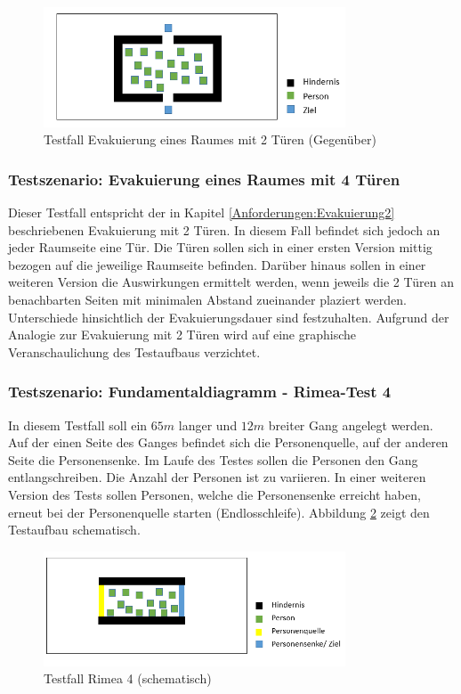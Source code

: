 \begin{figure}[htpb]
	\centering
	\includegraphics[width=0.8\textwidth]{abbildungen/Test_Evakuierung2_Gegueb.png}
	\caption{Testfall Evakuierung eines Raumes mit 2 Türen (Gegenüber)}
	\label{fig:Test_Evakuierung2_Gegueb}
\end{figure}

\subsubsection{Testszenario: Evakuierung eines Raumes mit 4 Türen}
Dieser Testfall entspricht der in Kapitel \ref{Anforderungen:Evakuierung2} beschriebenen Evakuierung mit 2 Türen. In diesem Fall befindet sich jedoch an jeder Raumseite eine Tür. Die Türen sollen sich in einer ersten Version mittig bezogen auf die jeweilige Raumseite befinden. Darüber hinaus sollen in einer weiteren Version die Auswirkungen ermittelt werden, wenn jeweils die 2 Türen an benachbarten Seiten mit minimalen Abstand zueinander plaziert werden. Unterschiede hinsichtlich der Evakuierungsdauer sind festzuhalten. Aufgrund der Analogie zur Evakuierung mit 2 Türen wird auf eine graphische Veranschaulichung des Testaufbaus verzichtet.

\subsubsection{Testszenario: Fundamentaldiagramm - Rimea-Test 4}
\label{Anforderungen:RimeaTest}
In diesem Testfall soll ein $65m$ langer und $12m$ breiter Gang angelegt werden. Auf der einen Seite des Ganges befindet sich die Personenquelle, auf der anderen Seite die Personensenke. Im Laufe des Testes sollen die Personen den Gang entlangschreiben. Die Anzahl der Personen ist zu variieren. In einer weiteren Version des Tests sollen Personen, welche die Personensenke erreicht haben, erneut bei der Personenquelle starten (Endlosschleife). Abbildung \ref{fig:Test_Rimea4} zeigt den Testaufbau schematisch.

\begin{figure}[htpb]
	\centering
	\includegraphics[width=0.8\textwidth]{abbildungen/Test_Rimea4-2.png}
	\caption{Testfall Rimea 4 (schematisch)}
	\label{fig:Test_Rimea4}
\end{figure}


